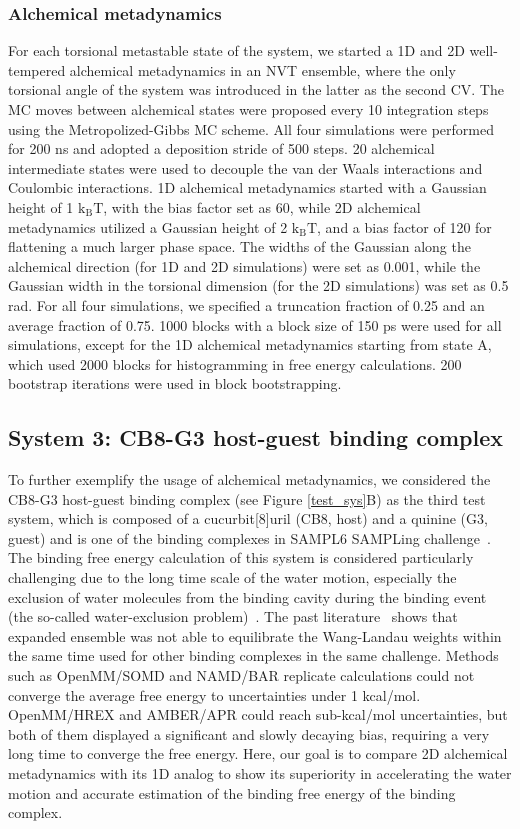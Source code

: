 \documentclass[journal=jacsat,manuscript=article]{achemso}
\begin{document}
\subsubsection{Alchemical metadynamics}
For each torsional metastable state of the system, we started a 1D and 2D well-tempered alchemical metadynamics in an NVT ensemble, where the only torsional angle of the system was introduced in the latter as the second CV. The MC moves between alchemical states were proposed every 10 integration steps using the Metropolized-Gibbs MC scheme. All four simulations were performed for 200 ns and adopted a deposition stride of 500 steps. 20 alchemical intermediate states were used to decouple the van der Waals interactions and Coulombic interactions. 1D alchemical metadynamics started with a Gaussian height of 1 $\text{k}_{\text{B}}\text{T}$, with the bias factor set as 60, while 2D alchemical metadynamics utilized a Gaussian height of 2 $\text{k}_{\text{B}}\text{T}$, and a bias factor of 120 for flattening a much larger phase space. The widths of the Gaussian along the alchemical direction (for 1D and 2D simulations) were set as 0.001, while the Gaussian width in the torsional dimension (for the 2D simulations) was set as 0.5 rad. For all four simulations, we specified a truncation fraction of 0.25 and an average fraction of 0.75. 1000 blocks with a block size of 150 ps were used for all simulations, except for the 1D alchemical metadynamics starting from state A, which used 2000 blocks for histogramming in free energy calculations. 200 bootstrap iterations were used in block bootstrapping. 

\subsection{System 3: CB8-G3 host-guest binding complex}
To further exemplify the usage of alchemical metadynamics, we considered the CB8-G3 host-guest binding complex (see Figure \ref{test_sys}B) as the third test system, which is composed of a cucurbit[8]uril (CB8, host) and a quinine (G3, guest) and is one of the binding complexes in SAMPL6 SAMPLing challenge~\cite{rizzi2018overview}. The binding free energy calculation of this system is considered particularly challenging due to the long time scale of the water motion, especially the exclusion of water molecules from the binding cavity during the binding event (the so-called water-exclusion problem)~\cite{rizzi2020sampl6}. The past literature~\cite{rizzi2020sampl6} shows that expanded ensemble was not able to equilibrate the Wang-Landau weights within the same time used for other binding complexes in the same challenge. Methods such as OpenMM/SOMD and NAMD/BAR replicate calculations could not converge the average free energy to uncertainties under 1 kcal/mol. OpenMM/HREX and AMBER/APR could reach sub-kcal/mol uncertainties, but both of them displayed a significant and slowly decaying bias, requiring a very long time to converge the free energy. Here, our goal is to compare 2D alchemical metadynamics with its 1D analog to show its superiority in accelerating the water motion and accurate estimation of the binding free energy of the binding complex. 
\end{document}
